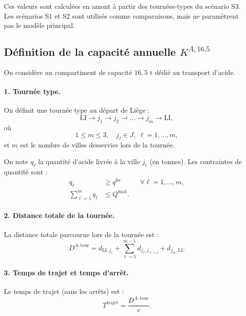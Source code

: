 \documentclass{article}
\begin{document}
Ces valeurs sont calculées en amont à partir des tournées-types du scénario S3.
Les scénarios S1 et S2 sont utilisés comme comparaisons, mais ne paramètrent pas
le modèle principal.

\subsection{Définition de la capacité annuelle $K^{A,16.5}$}

On considère un compartiment de capacité $16{,}5$ t dédié au transport d'acide.

\paragraph{1. Tournée type.}

On définit une tournée type au départ de Liège :
\[
  \text{LI} \to j_1 \to j_2 \to \dots \to j_m \to \text{LI},
\]
où
\[
  1 \le m \le 3, \quad j_\ell \in J, \; \ell = 1,\dots,m,
\]
et $m$ est le nombre de villes desservies lors de la tournée.

On note $q_\ell$ la quantité d'acide livrée à la ville $j_\ell$ (en tonnes).  
Les contraintes de quantité sont :
\begin{align}
  q_\ell &\ge \underline{q}^{\text{liv}} \quad &&\forall \ell = 1,\dots,m, \label{eq:q_min}\\
  \sum_{\ell=1}^{m} q_\ell &\le Q^{\max}. \label{eq:q_max}
\end{align}

\paragraph{2. Distance totale de la tournée.}

La distance totale parcourue lors de la tournée est :
\begin{equation}
  D^{A,\text{tour}}
  =
  d_{\mathrm{LI},j_1}
  + \sum_{\ell=1}^{m-1} d_{j_\ell, j_{\ell+1}}
  + d_{j_m,\mathrm{LI}}.
\end{equation}

\paragraph{3. Temps de trajet et temps d'arrêt.}

Le temps de trajet (sans les arrêts) est :
\begin{equation}
  T^{\text{trajet}} = \frac{D^{A,\text{tour}}}{v}.
\end{equation}
\end{document}
